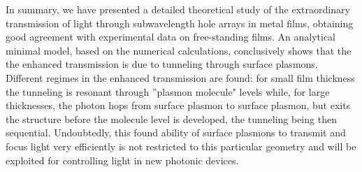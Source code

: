 In summary, we have presented a detailed theoretical study of the
extraordinary transmission of light through subwavelength hole
arrays in metal films, obtaining good agreement with experimental data on
free-standing films. An analytical minimal model, based on the
numerical calculations, conclusively shows that the 
the enhanced transmission is due to tunneling through surface plasmons. 
Different regimes in the enhanced transmission are found: 
for small film thickness the tunneling is resonant 
through ''plasmon molecule" levels while, for large thicknesses, 
the photon hops from surface plasmon to surface plasmon, but 
exits the structure before
the molecule level is developed, the tunneling being then sequential.
Undoubtedly, this found ability of surface plasmons to transmit and focus
light very efficiently is not restricted to this particular geometry and
will be exploited for controlling light in new photonic devices. 


